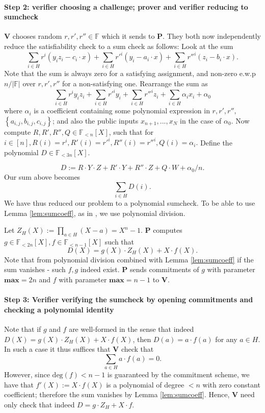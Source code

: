 \documentclass[11pt]{article}
\numberwithin{figure}{section} %
\renewcommand{\max}{\ensuremath{\mathrm{\mathbf{max}}}\xspace}
\newcommand{\summ}{\ensuremath{\sum_{i\in H}}\xspace}
\newcommand{\summa}{\ensuremath{\sum_{a\in H}}\xspace}
\newcommand{\set}[1]{\ensuremath{\left\{#1\right\}}\xspace}
\newcommand{\F}{\ensuremath{\mathbb F}\xspace}
\renewcommand{\deg}{\ensuremath{\mathrm{deg}}\xspace}
\newcommand{\defeq}{:=}
\newcommand{\prv}{\ensuremath{\mathsf{\mathbf{P}}}\xspace}
\newcommand{\ver}{\ensuremath{\mathsf{\mathbf{V}}}\xspace}
\newcommand{\polysofdeg}[1]{\ensuremath{\F_{< #1}[X]}\xspace}
\begin{document}
\paragraph{Step 2: verifier choosing a challenge; prover and verifier reducing to sumcheck}
\ver chooses random $r, r',r'' \in \F$ which it sends to \prv.
They both now independently reduce the satisfiability check to a sum check as follows:
Look at the sum
\[\summ r^i(y_iz_i - c_i\cdot x) + \summ r'^i(y_i - a_i\cdot x) + \summ r''^i(z_i - b_i
\cdot x).\]
Note that the sum is always zero for a satisfying assignment, and non-zero e.w.p $n/|\F|$ over $r, r', r''$ for a non-satisfying one.
Rearrange the sum as
\[\summ r^iy_iz_i +\summ r'^iy_i +\summ r''^i z_i +\summ \alpha_ix_i + \alpha_0\]
where $\alpha_i$ is a coefficient containing some polynomial expression in $r, r'
, r'',$  $\set{a_{i,j} , b_{i,j} , c_{i,j}}$; and also
the public inputs $x_{n+1}, . . . , x_N$ in the case of $\alpha_0$.
Now compute $R, R', R'', Q \in \polysofdeg{n}$, such that for $i \in [n], R(i) = r^i
, R'(i) = r'^i
, R''(i) =r''^i
, Q(i) = \alpha_i.$
Define the polynomial $D \in \polysofdeg{3n}$.

\[D \defeq R \cdot Y \cdot Z + R'\cdot Y + R''\cdot Z + Q \cdot W + \alpha_0/n.\]
Our sum above becomes
\[\summ D(i).\]
We have thus reduced our problem to a polynomial sumcheck. To be able to use Lemma \ref{lem:sumcoeff}, as in \cite{aurora}, we use polynomial division.

Let $Z_H(X) \defeq \prod_{a\in H}(X - a)=X^n-1$.
\prv computes $g \in \polysofdeg{2n}, f \in \polysofdeg{n-1}$ such that
\[D(X) = g(X) \cdot Z_H(X) + X \cdot f(X).\]
Note that from polynomial division combined with Lemma \ref{lem:sumcoeff} if the sum vanishes - such $f, g$
indeed exist.
\prv sends commitments of $g$ with parameter $\max=2n$ and $f$ with parameter $\max=n-1$ to \ver.
\paragraph{Step 3: Verifier verifying the sumcheck by opening commitments and checking a
polynomial identity}
Note that if $g$ and $f$ are well-formed in the sense that indeed $D(X) =
g(X) \cdot Z_H(X) + X \cdot f(X)$, then $D(a) = a \cdot f(a)$ for any $a \in H$. In such a case it thus suffices that
\ver check that
\[\summa a \cdot f(a) = 0.\]
However, since $\deg(f) < n - 1$ is guaranteed by the commitment scheme, we have that $f'(X) \defeq X \cdot f(X)$ is a polynomial of degree $< n$ with zero constant coefficient; therefore the sum vanishes
by Lemma \ref{lem:sumcoeff}.
Hence, \ver need only check that indeed
$D = g \cdot Z_H + X \cdot f$.
\end{document}
